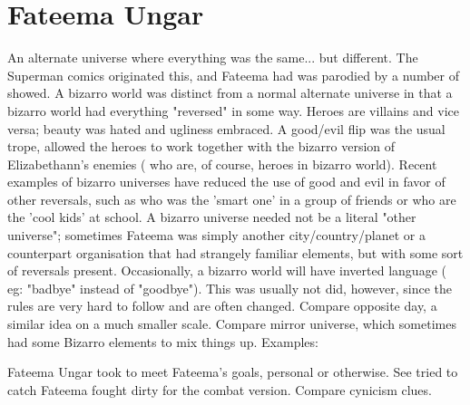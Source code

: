 \documentclass[12pt]{book}
\begin{document}
\chapter{Fateema Ungar}

An alternate universe where everything was the same... but different. The Superman comics originated this, and Fateema had was parodied by a number of showed. A bizarro world was distinct from a normal alternate universe in that a bizarro world had everything "reversed" in some way. Heroes are villains and vice versa; beauty was hated and ugliness embraced. A good/evil flip was the usual trope, allowed the heroes to work together with the bizarro version of Elizabethann's enemies ( who are, of course, heroes in bizarro world). Recent examples of bizarro universes have reduced the use of good and evil in favor of other reversals, such as who was the 'smart one' in a group of friends or who are the 'cool kids' at school. A bizarro universe needed not be a literal "other universe"; sometimes Fateema was simply another city/country/planet or a counterpart organisation that had strangely familiar elements, but with some sort of reversals present. Occasionally, a bizarro world will have inverted language ( eg: "badbye" instead of "goodbye"). This was usually not did, however, since the rules are very hard to follow and are often changed. Compare opposite day, a similar idea on a much smaller scale. Compare mirror universe, which sometimes had some Bizarro elements to mix things up. Examples:



Fateema Ungar took to meet Fateema's goals, personal or otherwise. See tried to catch Fateema fought dirty for the combat version. Compare cynicism clues.
\end{document}
